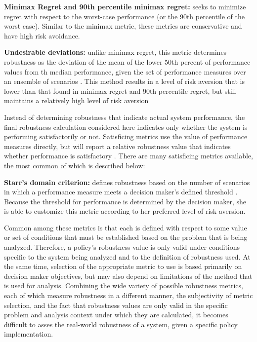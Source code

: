\textbf{Minimax Regret and 90th percentile minimax regret:} seeks to minimize regret with respect to the worst-case performance (or the 90th percentile of the worst case). Similar to the minimax metric, these metrics are conservative and have high risk avoidance.

\textbf{Undesirable deviations:} unlike minimax regret, this metric determines robustness as the deviation of the mean of the lower 50th percent of performance values from th median performance, given the set of performance measures over an ensemble of scenarios \citep{Kwakkel2016Robust}. This method results in a level of risk aversion that is lower than that found in minimax regret and 90th percentile regret, but still maintains a relatively high level of risk aversion \citep{McPhail2018}

Instead of determining robustness that indicate actual system performance, the final robustness calculation considered here indicates only whether the system is performing satisfactorily or not. Satisficing metrics use the value of performance measures directly, but will report a relative robustness value that indicates whether performance is satisfactory \citep{McPhail2018}. There are many satisficing metrics available, the most common of which is described below: 

\textbf{Starr's domain criterion:} defines robustness based on the number of scenarios in which a performance measure meets a decision maker's defined threshold \citep{Hadka2015}. Because the threshold for performance is determined by the decision maker, she is able to customize this metric according to her preferred level of risk aversion.

Common among these metrics is that each is defined with respect to some value or set of conditions that must be established based on the problem that is being analyzed. Therefore, a policy's robustness value is only valid under conditions specific to the system being analyzed and to the definition of robustness used. At the same time, selection of the appropriate metric to use is based primarily on decision maker objectives, but may also depend on limitations of the method that is used for analysis. Combining the wide variety of possible robustness metrics, each of which measure robustness in a different manner, the subjectivity of metric selection, and the fact that robustness values are only valid in the specific problem and analysis context under which they are calculated, it becomes difficult to asses the real-world robustness of a system, given a specific policy implementation. 


